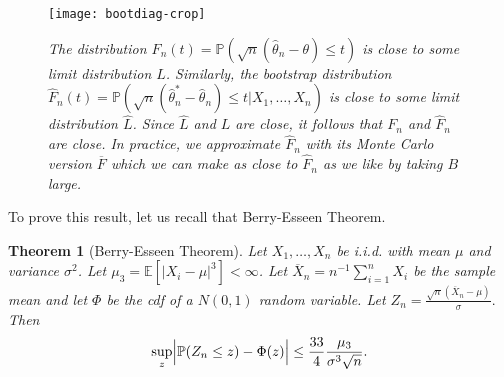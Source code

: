 \documentclass[twoside,12pt]{article}
\newcounter{lecnum}
\newtheorem{theorem}{Theorem}[lecnum]
\newcommand\E{\mathbb{E}}
\begin{document}
\begin{figure}
\begin{center}
\texttt{[image: bootdiag-crop]}
\end{center}
\vspace{-5in}
\caption{\em The distribution $F_n(t) = \mathbb{P}(\sqrt{n}(\widehat\theta_n - \theta) \leq t)$
is close to some limit distribution $L$.
Similarly, the bootstrap distribution $\widehat F_n(t) = \mathbb{P}(\sqrt{n}(\widehat\theta_n^* - \widehat\theta_n) \leq t|X_1,\ldots, X_n)$
is close to some limit distribution $\widehat L$.
Since $\widehat L$ and $L$ are close,
it follows that
$F_n$ and $\widehat F_n$ are close.
In practice, we approximate
$\widehat F_n$ with its Monte Carlo version $\overline{F}$
which we can make as close to
$\widehat F_n$ as we like by taking $B$ large.}
\label{fig::bootstrap-explained}
\end{figure}



To prove this result, let us recall that
Berry-Esseen Theorem.


\begin{theorem}[Berry-Esseen Theorem]
Let $X_1, \ldots, X_n$ be i.i.d. with mean
$\mu$ and variance $\sigma^2$.
Let
$\mu_3 = \E[ |X_i-\mu|^3] < \infty$.
Let $\overline{X}_n = n^{-1}\sum_{i=1}^n X_i $ be the sample mean
and let $\Phi$ be the cdf of a $N(0,1)$ random variable.
Let
$Z_n = \frac{\sqrt{n}(\overline{X}_n-\mu)}{\sigma}.$
Then
\begin{equation}
\sup_z \Bigl|\mathbb{P}(Z_n \leq z) - \Phi(z)\Bigr| \leq \frac{33}{4} \frac{\mu_3}{\sigma^3\sqrt{n}}.
\end{equation}
\end{theorem}
\end{document}
